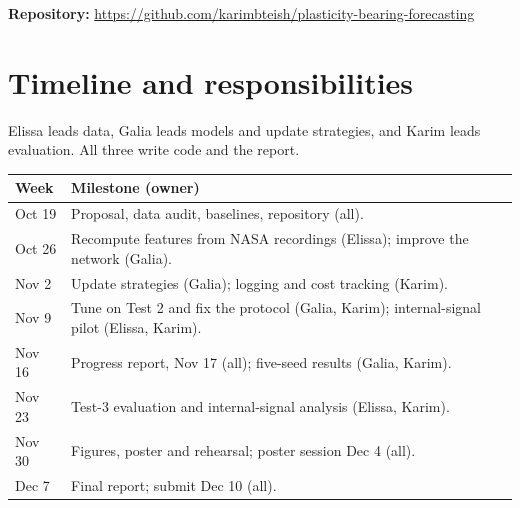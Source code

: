 \documentclass[11pt,twocolumn]{article}
\begin{document}
\textbf{Repository:}
\url{https://github.com/karimbteish/plasticity-bearing-forecasting}

\section{Timeline and responsibilities}
\small
Elissa leads data, Galia leads models and update strategies, and Karim leads evaluation. All three write code and the report.

\begin{tabular}{@{}p{}p{}@{}}\toprule
Week & Milestone (owner) \\\midrule
Oct 19 & Proposal, data audit, baselines, repository (all). \\
Oct 26 & Recompute features from NASA recordings (Elissa); improve the network (Galia). \\
Nov 2 & Update strategies (Galia); logging and cost tracking (Karim). \\
Nov 9 & Tune on Test 2 and fix the protocol (Galia, Karim); internal-signal pilot (Elissa, Karim). \\
Nov 16 & Progress report, Nov 17 (all); five-seed results (Galia, Karim). \\
Nov 23 & Test-3 evaluation and internal-signal analysis (Elissa, Karim). \\
Nov 30 & Figures, poster and rehearsal; poster session Dec 4 (all). \\
Dec 7 & Final report; submit Dec 10 (all). \\\bottomrule
\end{tabular}
\normalsize

\clearpage

\setlength{\bibsep}{4pt}
\small

\end{document}
